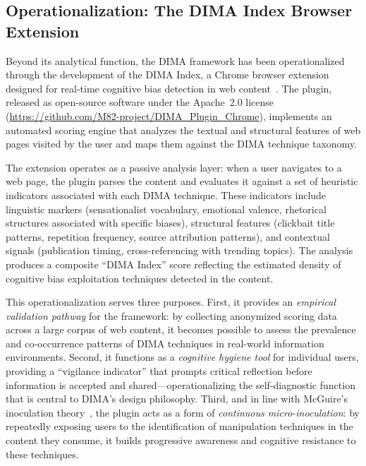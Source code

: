 \documentclass[11pt,a4paper]{article}
\begin{document}
\subsection{Operationalization: The DIMA Index Browser Extension}
\label{sec:plugin}

Beyond its analytical function, the DIMA framework has been operationalized through the development of the DIMA Index, a Chrome browser extension designed for real-time cognitive bias detection in web content~\cite{dimaplugin2025}. The plugin, released as open-source software under the Apache~2.0 license (\url{https://github.com/M82-project/DIMA_Plugin_Chrome}), implements an automated scoring engine that analyzes the textual and structural features of web pages visited by the user and maps them against the DIMA technique taxonomy.

The extension operates as a passive analysis layer: when a user navigates to a web page, the plugin parses the content and evaluates it against a set of heuristic indicators associated with each DIMA technique. These indicators include linguistic markers (sensationalist vocabulary, emotional valence, rhetorical structures associated with specific biases), structural features (clickbait title patterns, repetition frequency, source attribution patterns), and contextual signals (publication timing, cross-referencing with trending topics). The analysis produces a composite ``DIMA Index'' score reflecting the estimated density of cognitive bias exploitation techniques detected in the content.

This operationalization serves three purposes. First, it provides an \textit{empirical validation pathway} for the framework: by collecting anonymized scoring data across a large corpus of web content, it becomes possible to assess the prevalence and co-occurrence patterns of DIMA techniques in real-world information environments. Second, it functions as a \textit{cognitive hygiene tool} for individual users, providing a ``vigilance indicator'' that prompts critical reflection before information is accepted and shared---operationalizing the self-diagnostic function that is central to DIMA's design philosophy. Third, and in line with McGuire's inoculation theory~\cite{mcguire1961, mcguire1964}, the plugin acts as a form of \textit{continuous micro-inoculation}: by repeatedly exposing users to the identification of manipulation techniques in the content they consume, it builds progressive awareness and cognitive resistance to these techniques.
\end{document}
